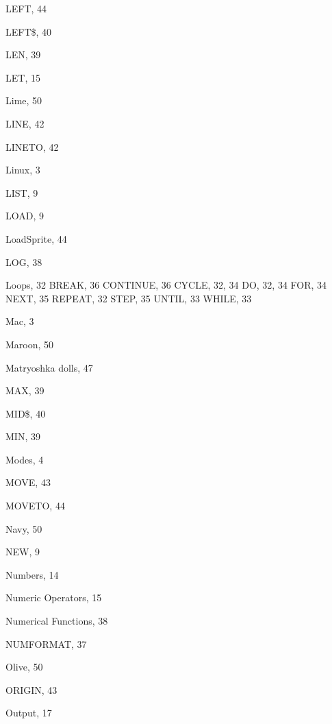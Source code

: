 \begin{theindex}
  \indexspace

  \item LEFT, 44
  \item LEFT\$, 40
  \item LEN, 39
  \item LET, 15
  \item Lime, 50
  \item LINE, 42
  \item LINETO, 42
  \item Linux, 3
  \item LIST, 9
  \item LOAD, 9
  \item LoadSprite, 44
  \item LOG, 38
  \item Loops, 32
    \subitem BREAK, 36
    \subitem CONTINUE, 36
    \subitem CYCLE, 32, 34
    \subitem DO, 32, 34
    \subitem FOR, 34
    \subitem NEXT, 35
    \subitem REPEAT, 32
    \subitem STEP, 35
    \subitem UNTIL, 33
    \subitem WHILE, 33

  \indexspace

  \item Mac, 3
  \item Maroon, 50
  \item Matryoshka dolls, 47
  \item MAX, 39
  \item MID\$, 40
  \item MIN, 39
  \item Modes, 4
  \item MOVE, 43
  \item MOVETO, 44

  \indexspace

  \item Navy, 50
  \item NEW, 9
  \item Numbers, 14
  \item Numeric Operators, 15
  \item Numerical Functions, 38
  \item NUMFORMAT, 37

  \indexspace

  \item Olive, 50
  \item ORIGIN, 43
  \item Output, 17

  \indexspace


\end{theindex}

